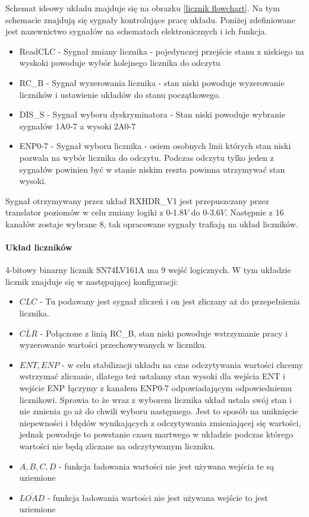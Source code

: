 Schemat ideowy układu znajduje się na obrazku \ref{licznik flowchart}.
Na tym schemacie znajdują się sygnały kontrolujące pracę układu. Poniżej zdefiniowane jest nazewnictwo sygnałów na schematach elektronicznych i ich funkcja.  
\begin{itemize}
        \item ReadCLC - Sygnał zmiany licznika - pojedynczej przejście stanu z niskiego na wyskoki powoduje wybór kolejnego licznika do odczytu
        \item RC\_B - Sygnał wyzerowania licznika - stan niski powoduje wyzerowanie liczników i ustawienie układów do stanu początkowego.
        \item DIS\_S - Sygnał wyboru dyskryminatora - Stan niski powoduje wybranie sygnałów 1A0-7 a wysoki 2A0-7
        \item ENP0-7 - Sygnał wyboru licznika - osiem osobnych linii których stan niski pozwala na wybór licznika do odczytu. Podczas odczytu tylko jeden z sygnałów powinien być w stanie niskim reszta powinna utrzymywać stan wysoki. 
\end{itemize}
Sygnał otrzymywany przez układ RXHDR\_V1 jest przepuszczany przez translator poziomów w celu zmiany logiki z 0-1.8$V$ do 0-3.6$V$. Następnie z 16 kanałów zostaje wybrane 8, tak opracowane sygnały trafiają na układ liczników.

\paragraph{Układ liczników \cite{licznik doc}\cite{slave}}

4-bitowy binarny licznik SN74LV161A ma 9 wejść logicznych. 
W tym układzie licznik znajduje się w następującej konfiguracji:
\begin{itemize}
        \item $CLC$ - Tu podawany jest sygnał zliczeń i on jest zliczany aż do przepełnienia licznika.
        \item $\overline{CLR}$ - Połączone z linią RC\_B, stan niski powoduje wstrzymanie pracy i wyzerowanie wartości przechowywanych w liczniku. 
        \item $ENT,ENP$ - w celu stabilizacji układu na czas odczytywania wartości chcemy wstrzymać zliczanie, dlatego też ustalamy stan wysoki dla wejścia ENT i wejście ENP łączymy z kanałem ENP0-7 odpowiadającym odpowiedniemu licznikowi.
        Sprawia to że wraz z wyborem licznika układ ustala swój stan i nie zmienia go aż do chwili wyboru następnego. 
        Jest to sposób na uniknięcie niepewności i błędów wynikających z odczytywania zmieniającej się wartości, jednak powoduje to powstanie czasu martwego w układzie podczas którego wartości nie będą zliczane na odczytywanym liczniku.
        \item $A,B,C,D$ - funkcja ładowania wartości nie jest używana wejścia te są uziemione
        \item $\overline{LOAD}$ - funkcja ładowania wartości nie jest używana wejście to jest uziemione
\end{itemize} 

